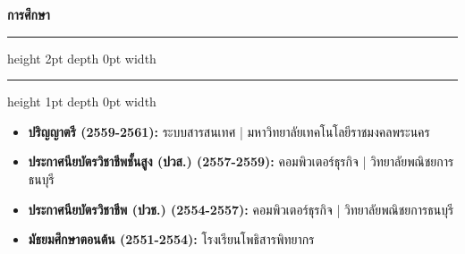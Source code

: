 \documentclass[11pt, a4paper]{article}
\newcommand{\sectiontitle}[1]{
    \vspace{1em}
    {\Large\bfseries\sffamily\color{primaryblue} #1} 
    \vspace{0.3em}
    \hrule height 2pt depth 0pt width \textwidth \color{linecolor}
    \hrule height 1pt depth 0pt width \textwidth
    \vspace{0.7em}
}
\begin{document}
\sectiontitle{การศึกษา}
\color{black}
\begin{itemize}
    \item \textbf{ปริญญาตรี (2559-2561):} ระบบสารสนเทศ | มหาวิทยาลัยเทคโนโลยีราชมงคลพระนคร
    \item \textbf{ประกาศนียบัตรวิชาชีพชั้นสูง (ปวส.) (2557-2559):} คอมพิวเตอร์ธุรกิจ | วิทยาลัยพณิชยการธนบุรี
    \item \textbf{ประกาศนียบัตรวิชาชีพ (ปวช.) (2554-2557):} คอมพิวเตอร์ธุรกิจ | วิทยาลัยพณิชยการธนบุรี
    \item \textbf{มัธยมศึกษาตอนต้น (2551-2554):} โรงเรียนโพธิสารพิทยากร
\end{itemize}
\end{document}
